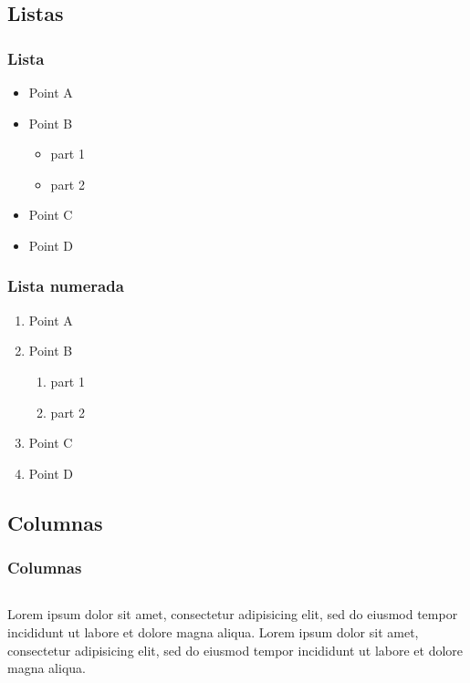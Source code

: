 \documentclass[aspectratio=43]{beamer}
\begin{document}
\subsection{Listas}

\begin{frame}
    \frametitle{Lista}
    \begin{itemize}
    \item Point A
    \item Point B
    \begin{itemize}
        \item part 1
        \item part 2
    \end{itemize}
    \item Point C
    \item Point D
    \end{itemize}
\end{frame}

\begin{frame}
    \frametitle{Lista numerada}
    \begin{enumerate}[I]
    \item Point A
    \item Point B
        \begin{enumerate}[i]
        \item part 1
        \item part 2
        \end{enumerate}
    \item Point C
    \item Point D
    \end{enumerate}    
\end{frame}

\subsection{Columnas}

\begin{frame}
    \frametitle{Columnas}
    \begin{columns}
        Lorem ipsum dolor sit amet, consectetur adipisicing elit, sed do eiusmod tempor incididunt ut labore et dolore magna aliqua.
        Lorem ipsum dolor sit amet, consectetur adipisicing elit, sed do eiusmod tempor incididunt ut labore et dolore magna aliqua.
    \end{columns}
\end{frame}
\end{document}
